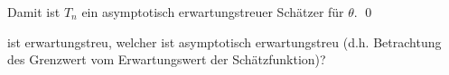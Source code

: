 \documentclass{abgabe}
\begin{document}
\begin{questions}
\begin{parts}
\begin{subparts}
\begin{solution}
                Damit ist $T_n$ ein asymptotisch erwartungstreuer Schätzer für $\theta$.
                \qed
            \end{solution}
        \end{subparts}
        ist erwartungstreu, welcher ist asymptotisch erwartungstreu (d.h. Betrachtung des Grenzwert vom Erwartungswert der Schätzfunktion)?
    \end{parts}
\end{questions}
\end{document}
